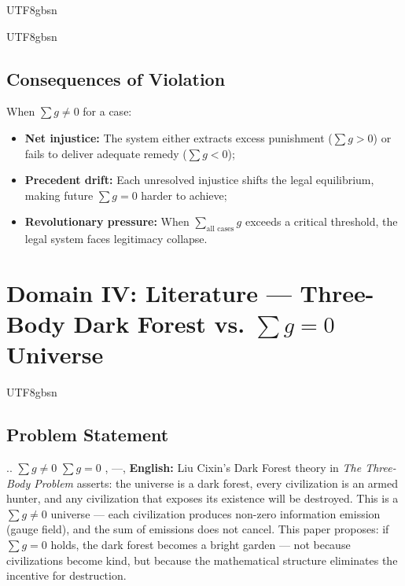 \documentclass[11pt,a4paper]{article}
\begin{document}
\begin{CJK}{UTF8}{gbsn}
{\begin{CJK}{UTF8}{gbsn}
\subsection{Consequences of Violation}
When $\sum g \neq 0$ for a case:
\begin{itemize}
    \item \textbf{Net injustice:} The system either extracts excess punishment
          ($\sum g > 0$) or fails to deliver adequate remedy ($\sum g < 0$);
    \item \textbf{Precedent drift:} Each unresolved injustice shifts the legal
          equilibrium, making future $\sum g = 0$ harder to achieve;
    \item \textbf{Revolutionary pressure:} When $\sum_{\text{all cases}} g$ exceeds
          a critical threshold, the legal system faces legitimacy collapse.
\end{itemize}
\end{CJK}
\section{Domain IV: Literature --- Three-Body Dark Forest vs. $\sum g = 0$ Universe}
\label{sec:literature}
\begin{CJK}{UTF8}{gbsn}
\subsection{Problem Statement}
\noindent
.. $\sum g \neq 0$ 
 $\sum g = 0$ , ---, 
\vspace{0.3cm}
\noindent
\textbf{English:} Liu Cixin's Dark Forest theory in \textit{The Three-Body Problem}
asserts: the universe is a dark forest, every civilization is an armed hunter, and
any civilization that exposes its existence will be destroyed. This is a $\sum g \neq 0$
universe --- each civilization produces non-zero information emission (gauge field),
and the sum of emissions does not cancel. This paper proposes: if $\sum g = 0$ holds,
the dark forest becomes a bright garden --- not because civilizations become kind,
but because the mathematical structure eliminates the incentive for destruction.

\end{CJK}}
\end{CJK}
\end{document}
